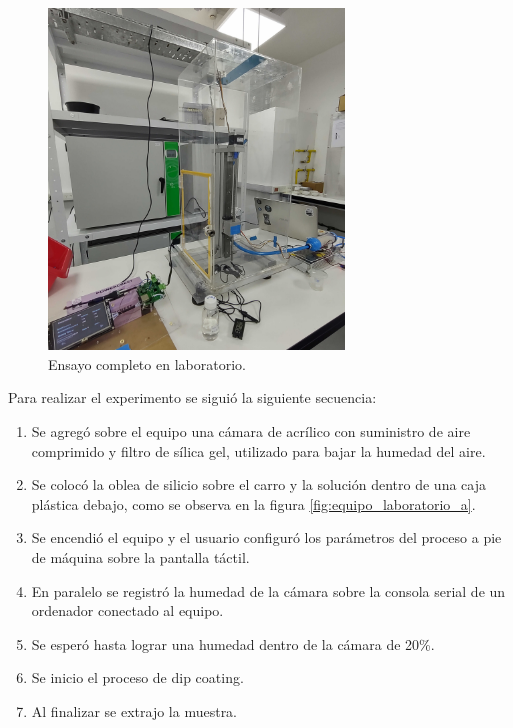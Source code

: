 \begin{figure}[h!]
\centering 
\includegraphics[width=0.7\textwidth]{./Figures/prueba_b.jpg}
\caption{Ensayo completo en laboratorio.}
\label{fig:equipo_laboratorio}
\end{figure}


Para realizar el experimento se siguió la siguiente secuencia:
\begin{enumerate}
\item Se agregó sobre el equipo una cámara de acrílico con suministro de aire comprimido y filtro de sílica gel, utilizado para bajar la humedad del aire.
\item Se colocó la oblea de silicio sobre el carro y la solución dentro de una caja plástica debajo, como se observa en la figura \ref{fig:equipo_laboratorio_a}.
\item Se encendió el equipo y el usuario configuró los parámetros del proceso a pie de máquina sobre la pantalla táctil.
\item En paralelo se registró la humedad de la cámara sobre la consola serial de un ordenador conectado al equipo.
\item Se esperó hasta lograr una humedad dentro de la cámara de 20\%.
\item Se inicio el proceso de dip coating.
\item Al finalizar se extrajo la muestra.
\end{enumerate}

